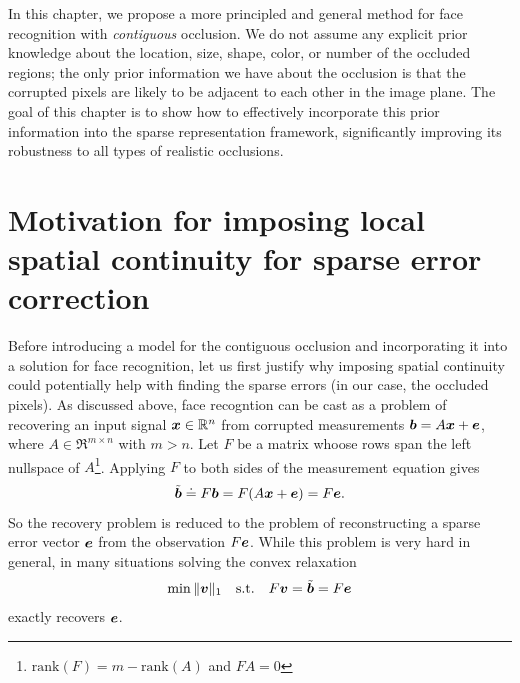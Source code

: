 In this chapter, we propose a more principled and general method for face
recognition with {\em contiguous} occlusion. We do not assume any explicit
prior knowledge about the location, size, shape, color, or number of the
occluded regions; the only prior information we have about the occlusion is
that the corrupted pixels are likely to be adjacent to each other in the image
plane. The goal of this chapter is to show how to effectively incorporate this
prior information into the sparse representation framework, significantly
improving its robustness to all types of realistic occlusions.

\section{Motivation for imposing local spatial continuity for sparse error correction}
Before introducing a model for the contiguous occlusion and incorporating it into a solution for face recognition, let us first justify why imposing spatial continuity could potentially help with finding the sparse errors (in our case, the occluded pixels). As discussed above, face recogntion can be cast as a problem of recovering an input signal ${\boldsymbol{x}}\in \mathbb R^n$ from corrupted measurements $\boldsymbol{b} = A{\boldsymbol{x}}+\boldsymbol{e}$, where $A\in
\Re^{m\times n}$ with $m>n$. Let $F$ be a matrix whoose rows span the left nullspace of
$A$\footnote{$\mathrm{rank}(F) = m - \mathrm{rank}(A)$ and $FA=0$}. Applying $F$ to both sides of the measurement equation gives \vspace{0mm}
\begin{displaymath}
\tilde{\bb} \doteq F \bb = F(A \x+ \e) = F\e. \vspace{0mm}
\end{displaymath}
So the recovery problem is reduced to the problem of reconstructing
a sparse error vector $\boldsymbol{e}$ from the observation $F \boldsymbol{e}$. While this problem is very hard in general, in many situations solving the convex relaxation \vspace{0mm}
\begin{equation*}
\min \| \mathbf{v} \|_1 \quad \textup{s.t.} \quad F \mathbf{v} = \tilde{\bb} = F \e \vspace{0mm}
\end{equation*}
exactly recovers $\boldsymbol{e}$.

